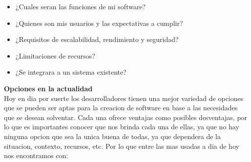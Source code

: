 \documentclass[12pt]{article}
\begin{document}
\begin{itemize}
    \item{¿Cuales seran las funciones de mi software?}
    \item{¿Quienes son mis usuarios y las expectativas a cumplir?}
    \item{¿Requisitos de escalabilidad, rendimiento y seguridad?}
    \item{¿Limitaciones de recursos?} 
    \item{¿Se integrara a un sistema existente?}
\end{itemize}

\textbf{Opciones en la actualidad} \\
Hoy en dia por suerte los desarrolladores tienen una mejor variedad de opciones que se pueden ser aptas para la creacion de software en base a las necesidades que se desean solventar.
Cada una ofrece ventajas como posibles desventajas, por lo que es importantes conocer que nos brinda cada una de ellas, ya que no hay ninguna opcion que sea la unica buena de todas, ya que dependera de la situacion, contexto, recursos, etc. Por lo que entre las mas usadas a dia de hoy nos encontramos con:
\end{document}
